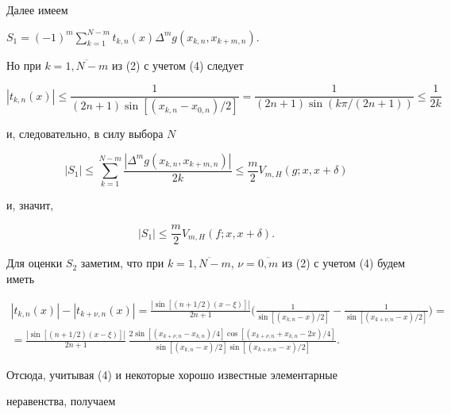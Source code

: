 Далее имеем


$S_1=(-1)^m\sum\limits_{k=1}^{N-m}t_{k,n}(x)\Delta^mg(x_{k,n},x_{k+m,n})$.


Но при $k=\overline{1,N-m}$ из (2) с учетом (4) следует


$$


|t_{k,n}(x)|\le\frac 1{(2n+1)\sin[(x_{k,n}-x_{0,n})/2]}=


\frac 1{(2n+1)\sin(k\pi/(2n+1))}\le\frac 1{2k}


$$


и, следовательно, в силу выбора $N$


$$


|S_1|\le\sum_{k=1}^{N-m}\frac{|\Delta^mg(x_{k,n},x_{k+m,n})|}


{2k}\le\frac m2V_{m,H}(g;x,x+\delta)


$$


и, значит,


\begin{equation}


|S_1|\le\frac m2V_{m,H}(f;x,x+\delta).


\end{equation}





Для оценки $S_2$ заметим, что при $k=\overline{1,N-m}$, $\nu=


\overline{0,m}$ из (2) с учетом (4) будем иметь


\begin{multline*}


|t_{k,n}(x)|-|t_{k+\nu,n}(x)|=


\frac{|\sin[(n+1/2)


(x-\xi)]|}{2n+1}\bigg(\frac1{\sin[(x_{k,n}-x)/2]}-\frac1


{\sin[(x_{k+\nu,n}-x)/2]}\bigg)=\\


%


=\frac{|\sin[(n+1/2)(x-\xi)]|}{2n+1}\,\frac{2\sin[(x_{k+\nu,


n}-x_{k,n})/4]\cos[(x_{k+\nu,n}+x_{k,n}-2x)/4]}{\sin[(x_{k,n}-


x)/2]\sin[(x_{k+\nu,n}-x)/2]}.


\end{multline*}


Отсюда, учитывая (4) и некоторые хорошо известные элементарные


неравенства, получаем


